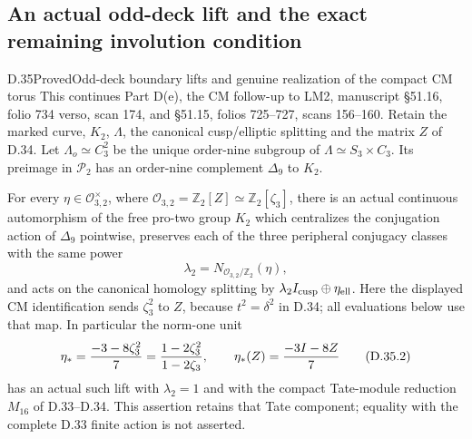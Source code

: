 \subsection{An actual odd-deck lift and the exact remaining involution condition}

\begin{statement}{D.35}{Proved}{Odd-deck boundary lifts and genuine realization of the compact CM torus}
This continues Part D(e), the CM follow-up to LM2, manuscript
\S51.16, folio 734 verso, scan 174, and \S51.15, folios 725--727,
scans 156--160. Retain the marked curve, $K_2$, $\Lambda$, the
canonical cusp/elliptic splitting and the matrix $Z$ of D.34.
Let $\Lambda_o\simeq C_3^2$ be the unique order-nine subgroup of
$\Lambda\simeq S_3\times C_3$. Its preimage in $\mathcal P_2$ has
an order-nine complement $\Delta_9$ to $K_2$.

For every $\eta\in\mathcal O_{3,2}^{\times}$, where
$\mathcal O_{3,2}=\mathbb Z_2[Z]\simeq\mathbb Z_2[\zeta_3]$,
there is an actual continuous automorphism of the free pro-two group
$K_2$ which centralizes the conjugation action of $\Delta_9$
pointwise, preserves each of the three peripheral conjugacy classes
with the same power
\[
                  \lambda_2=N_{\mathcal O_{3,2}/\mathbb Z_2}(\eta),
                                                               \tag{D.35.1}
\]
and acts on the canonical homology splitting by
$\lambda_2 I_{\rm cusp}\oplus\eta_{\rm ell}$.
Here the displayed CM identification sends $\zeta_3^2$ to $Z$,
because $t^2=\delta^2$ in D.34; all evaluations below use that map.
In particular the norm-one unit
\[
 \eta_*={-3-8\zeta_3^2\over7}
        ={1-2\zeta_3^2\over1-2\zeta_3},\qquad
 \eta_*(Z)={-3I-8Z\over7}                            \tag{D.35.2}
\]
has an actual such lift with $\lambda_2=1$ and with the compact
Tate-module reduction $M_{16}$ of D.33--D.34. This assertion retains
that Tate component; equality with the complete D.33 finite action
is not asserted.


\end{statement}
